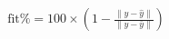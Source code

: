 \documentclass[preview]{standalone}
\begin{document}
\begin{align*}
\text{fit\%} = 100 \times \left(1 - \frac{\|y - \hat{y}\|}{\|y - \bar{y}\|}\right)
\end{align*}
\end{document}
